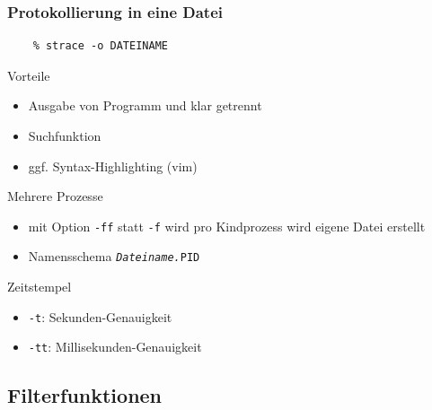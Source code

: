 \begin{frame}[fragile]
  \frametitle{Protokollierung in eine Datei}

  \vspace{-1mm}

  \begin{lstlisting}
    % strace -o DATEINAME
  \end{lstlisting}

  \vspace{-1mm}

  \begin{block}{Vorteile}
    \begin{itemize}
      \item Ausgabe von Programm und \strace{} klar getrennt
      \item Suchfunktion
      \item ggf. Syntax-Highlighting (vim)
     \end{itemize}
  \end{block}

  \begin{block}{Mehrere Prozesse}
    \begin{itemize}
      \item mit  Option \texttt{-ff} statt \texttt{-f}
         wird pro Kindprozess wird eigene Datei erstellt
      \item Namensschema \texttt{\emph{Dateiname.}PID}
     \end{itemize}
  \end{block}

  \begin{block}{Zeitstempel}
    \begin{itemize}
      \item \texttt{-t}: Sekunden-Genauigkeit
      \item \texttt{-tt}: Millisekunden-Genauigkeit
    \end{itemize}
  \end{block}
\end{frame}

\subsection{Filterfunktionen}

